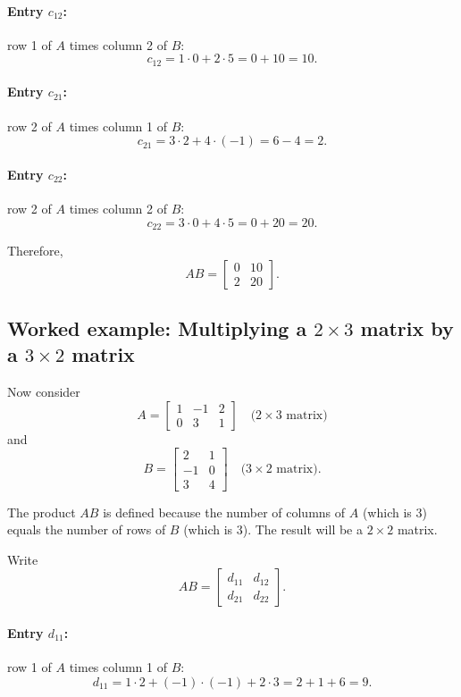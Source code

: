 \documentclass[12pt]{article}
\begin{document}
	\paragraph{Entry $c_{12}$:} row 1 of $A$ times column 2 of $B$:
	\[
	c_{12} = 1\cdot 0 + 2\cdot 5 = 0 + 10 = 10.
	\]
	
	\paragraph{Entry $c_{21}$:} row 2 of $A$ times column 1 of $B$:
	\[
	c_{21} = 3\cdot 2 + 4\cdot(-1) = 6 - 4 = 2.
	\]
	
	\paragraph{Entry $c_{22}$:} row 2 of $A$ times column 2 of $B$:
	\[
	c_{22} = 3\cdot 0 + 4\cdot 5 = 0 + 20 = 20.
	\]
	
	Therefore,
	\[
	AB =
	\begin{bmatrix}
		0 & 10 \\
		2 & 20
	\end{bmatrix}.
	\]
	
	\subsection*{Worked example: Multiplying a $2\times 3$ matrix by a $3\times 2$ matrix}
	
	Now consider
	\[
	A =
	\begin{bmatrix}
		1 & -1 & 2 \\
		0 & 3 & 1
	\end{bmatrix}
	\quad \text{($2\times 3$ matrix)}
	\]
	and
	\[
	B =
	\begin{bmatrix}
		2 & 1 \\
		-1 & 0 \\
		3 & 4
	\end{bmatrix}
	\quad \text{($3\times 2$ matrix)}.
	\]
	
	The product $AB$ is defined because the number of columns of $A$ (which is $3$) equals the number of rows of $B$ (which is $3$). The result will be a $2\times 2$ matrix.
	
	Write
	\[
	AB =
	\begin{bmatrix}
		d_{11} & d_{12} \\
		d_{21} & d_{22}
	\end{bmatrix}.
	\]
	
	\paragraph{Entry $d_{11}$:} row 1 of $A$ times column 1 of $B$:
	\[
	d_{11} = 1\cdot 2 + (-1)\cdot(-1) + 2\cdot 3 = 2 + 1 + 6 = 9.
	\]
	
\end{document}
